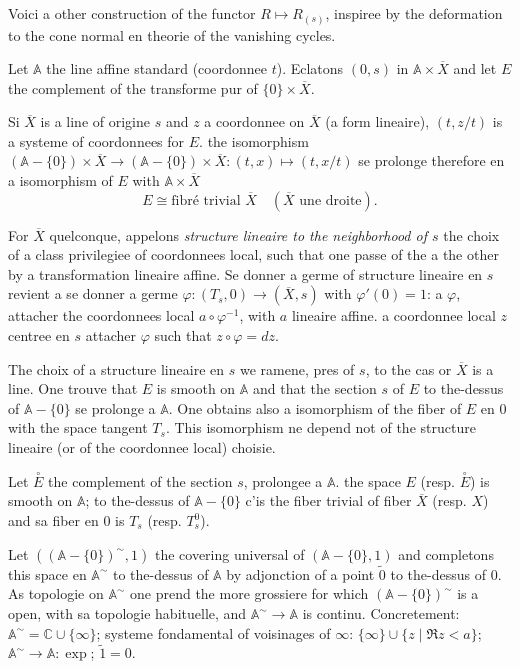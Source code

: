 \documentclass[12pt,a4paper]{article}
\theoremstyle{plain}
\theoremstyle{definition}
\theoremstyle{remark}
\newcommand{\bC}{\mathbb{C}}
\newcommand{\bA}{\mathbb{A}}
\begin{document}
Voici a other construction of the functor $R \mapsto R_{(s)}$, inspiree by the deformation to the cone normal en theorie of the vanishing cycles.

Let $\bA$ the line affine standard (coordonnee $t$). Eclatons $(0, s)$ in $\bA \times \overline{X}$ and let $E$ the complement of the transforme pur of $\{0\} \times \overline{X}$.

Si $\overline{X}$ is a line of origine $s$ and $z$ a coordonnee on $\overline{X}$ (a form lineaire), $(t, z/t)$ is a systeme of coordonnees for $E$. the isomorphism $(\bA - \{0\}) \times \overline{X} \to (\bA - \{0\}) \times \overline{X}: (t, x) \mapsto (t, x/t)$ se prolonge therefore en a isomorphism of $E$ with $\bA \times \overline{X}$
\begin{equation}\label{eq:15.12.1}
E \cong \text{fibré trivial } \overline{X} \quad (\overline{X} \text{ une droite}).
\end{equation}

For $\overline{X}$ quelconque, appelons \emph{structure lineaire to the neighborhood of $s$} the choix of a class privilegiee of coordonnees local, such that one passe of the a the other by a transformation lineaire affine. Se donner a germe of structure lineaire en $s$ revient a se donner a germe $\varphi : (T_s, 0) \to (\overline{X}, s)$ with $\varphi'(0) = 1$: a $\varphi$, attacher the coordonnees local $a \circ \varphi^{-1}$, with $a$ lineaire affine. a coordonnee local $z$ centree en $s$ attacher $\varphi$ such that $z \circ \varphi = dz$.

The choix of a structure lineaire en $s$ we ramene, pres of $s$, to the cas or $\overline{X}$ is a line. One trouve that $E$ is smooth on $\bA$ and that the section $s$ of $E$ to the-dessus of $\bA - \{0\}$ se prolonge a $\bA$. One obtains also a isomorphism of the fiber of $E$ en $0$ with the space tangent $T_s$. This isomorphism ne depend not of the structure lineaire (or of the coordonnee local) choisie.

Let $\overset{\circ}{E}$ the complement of the section $s$, prolongee a $\bA$. the space $E$ (resp. $\overset{\circ}{E}$) is smooth on $\bA$; to the-dessus of $\bA - \{0\}$ c'is the fiber trivial of fiber $\overline{X}$ (resp. $X$) and sa fiber en $0$ is $T_s$ (resp. $T_s^0$).

Let $((\bA - \{0\})^\sim, 1)$ the covering universal of $(\bA - \{0\}, 1)$ and completons this space en $\bA^\sim$ to the-dessus of $\bA$ by adjonction of a point $\tilde{0}$ to the-dessus of $0$. As topologie on $\bA^\sim$ one prend the more grossiere for which $(\bA - \{0\})^\sim$ is a open, with sa topologie habituelle, and $\bA^\sim \to \bA$ is continu. Concretement: $\bA^\sim = \bC \cup \{\infty\}$; systeme fondamental of voisinages of $\infty$: $\{\infty\} \cup \{z \mid \Re z < a\}$; $\bA^\sim \to \bA: \exp$; $\tilde{1} = 0$.
\end{document}
